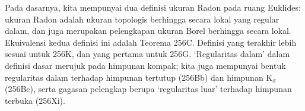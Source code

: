 {Pada dasarnya, kita mempunyai dua definisi ukuran Radon pada ruang Euklides:
ukuran Radon adalah ukuran topologis berhingga secara lokal yang regular dalam,
dan juga merupakan pelengkapan ukuran Borel berhingga secara lokal. Ekuivalensi kedua
definisi ini adalah Teorema 256C. Definisi yang terakhir lebih sesuai untuk
256K, dan yang pertama untuk 256G. `Regularitas dalam' dalam definisi dasar
merujuk pada himpunan kompak; kita juga mempunyai bentuk regularitas dalam
terhadap himpunan tertutup (256Bb) dan himpunan K$_{\sigma}$ (256Bc), serta
gagasan pelengkap berupa `regularitas luar' terhadap himpunan terbuka (256Xi).

}%

\discrpage
